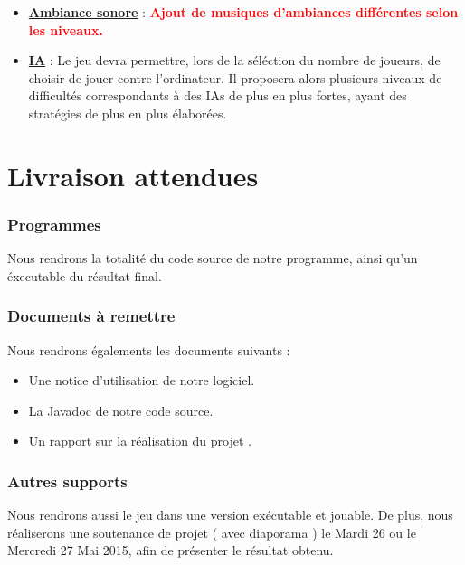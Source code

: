 \begin{itemize}
\begin{itemize}
      \end{itemize}

    \vspace{1cm}
    \item \textbf{\underline{Ambiance sonore}} : 
      \textcolor{red}{\textbf{Ajout de musiques d'ambiances différentes selon les niveaux.}}

    \vspace{1cm}
    \item \textbf{\underline{IA}} : Le jeu devra permettre, lors de la séléction du nombre de joueurs, de choisir de jouer contre l'ordinateur. Il proposera alors plusieurs niveaux de difficultés correspondants à des IAs de plus en plus fortes, ayant des stratégies de plus en plus élaborées.
  \end{itemize}

\section{Livraison attendues}

  \subsubsection{Programmes}
    Nous rendrons la totalité du code source de notre programme, ainsi qu'un éxecutable du résultat final.
  \subsubsection{Documents à remettre}
    Nous rendrons égalements les documents suivants : 
    \begin{itemize}
      \item Une notice d'utilisation de notre logiciel.
      \item La Javadoc de notre code source.
      \item Un rapport sur la réalisation du projet .
    \end{itemize}
  
  \subsubsection{Autres supports}
    Nous rendrons aussi le jeu dans une version exécutable et jouable.
    De plus, nous réaliserons une soutenance de projet ( avec diaporama ) le Mardi 26 ou le Mercredi 27 Mai 2015, afin de présenter le résultat obtenu.
